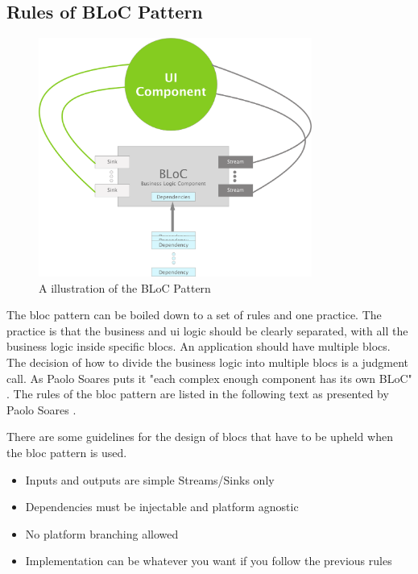 \subsection{Rules of BLoC Pattern}
\begin{figure}[h]
    \centering
    \includegraphics[width=0.8\textwidth]{figures/BLoCPattern.png}
    \caption{A illustration of the BLoC Pattern}
    \label{fig:blocPattern}
\end{figure}

The \gls{bloc} pattern can be boiled down to a set of rules and one practice. The practice is that the business and \gls{ui} logic should be clearly separated, with all the business logic inside specific \glspl{bloc}. An application should have multiple \glspl{bloc}. The decision of how to divide the business logic into multiple \glspl{bloc} is a judgment call. As Paolo Soares puts it "each complex enough component has its own BLoC" \cite[24 min 15 sec]{blocPattern}. The rules of the \gls{bloc} pattern are listed in the following text as presented by Paolo Soares \cite[22 min 25 sec]{blocPattern}.

There are some guidelines for the design of \glspl{bloc} that have to be upheld when the \gls{bloc} pattern is used.
\begin{itemize}
  \item Inputs and outputs are simple Streams/Sinks only
  \item Dependencies must be injectable and platform agnostic
  \item No platform branching allowed
  \item Implementation can be whatever you want if you follow the previous rules
\end{itemize}

